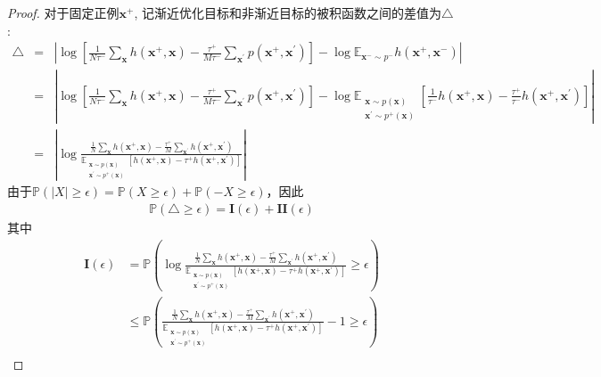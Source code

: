 \begin{lemma}
\begin{proof}
对于固定正例$\mathbf{x}^+$, 记渐近优化目标和非渐近目标的被积函数之间的差值为$\triangle$:
		\begin{eqnarray}
			\triangle &=& | \log [ \frac{1}{N\tau^-}  \sum_{\mathbf{x}} h(\mathbf{x}^+,\mathbf{x})  -\frac{\tau^+}{M\tau^-} \sum_{\mathbf{x}^\prime} p(\mathbf{x}^+,\mathbf{x}^\prime)]  - \log\mathbb{E}_{\mathbf{x}^-\sim p^-}h(\mathbf{x}^+,\mathbf{x}^-)|\nonumber \\
			&=&| \log [ \frac{1}{N\tau^-}  \sum_{\mathbf{x}} h(\mathbf{x}^+,\mathbf{x})  -\frac{\tau^+}{M\tau^-} \sum_{\mathbf{x}^\prime} p(\mathbf{x}^+,\mathbf{x}^\prime)]  - \log\mathbb{E}_{\substack{\mathbf x \sim p(\mathbf x) \\ \mathbf x^\prime \sim p^+(\mathbf x)}} [ \frac{1}{\tau^-}h(\mathbf{x}^+,\mathbf{x}) - \frac{\tau^+}{\tau^-}h(\mathbf{x}^+,\mathbf{x}^\prime)]| \nonumber\\
			&=& | \log \frac{\frac{1}{N}  \sum_{\mathbf{x}} h(\mathbf{x}^+,\mathbf{x})  -\frac{\tau^+}{M} \sum_{\mathbf{x}^\prime} h(\mathbf{x}^+,\mathbf{x}^\prime)}{\mathbb{E}_{\substack{\mathbf x \sim p(\mathbf x) \\ \mathbf x^\prime \sim p^+(\mathbf x)}} [ h(\mathbf{x}^+,\mathbf{x}) - \tau^+h(\mathbf{x}^+,\mathbf{x}^\prime)]} | \nonumber
		\end{eqnarray}
由于$\mathbb{P}(|X|\geq \epsilon )=\mathbb{P}(X\geq \epsilon )+\mathbb{P}(-X\geq \epsilon )$，因此
		\begin{eqnarray}
			\mathbb{P}(\triangle \geq \epsilon) = \mathbf{I}(\epsilon) + \mathbf{II}(\epsilon) 
		\end{eqnarray}
其中
		\begin{align}
			\mathbf{I}(\epsilon) 
			&= \mathbb{P} \left(\log \frac{\frac{1}{N}  \sum_{\mathbf{x}} h(\mathbf{x}^+,\mathbf{x})  -\frac{\tau^+}{M} \sum_{\mathbf{x}^\prime} h(\mathbf{x}^+,\mathbf{x}^\prime)}{\mathbb{E}_{\substack{\mathbf x \sim p(\mathbf x) \\ \mathbf x^\prime \sim p^+(\mathbf x)}} [ h(\mathbf{x}^+,\mathbf{x}) - \tau^+h(\mathbf{x}^+,\mathbf{x}^\prime)]} \geq \epsilon  \right) \\
			&\leq \mathbb{P} \left( \frac{\frac{1}{N}  \sum_{\mathbf{x}} h(\mathbf{x}^+,\mathbf{x})  -\frac{\tau^+}{M} \sum_{\mathbf{x}^\prime} h(\mathbf{x}^+,\mathbf{x}^\prime)}{\mathbb{E}_{\substack{\mathbf x \sim p(\mathbf x) \\ \mathbf x^\prime \sim p^+(\mathbf x)}} [ h(\mathbf{x}^+,\mathbf{x}) - \tau^+h(\mathbf{x}^+,\mathbf{x}^\prime)]}-1 \geq \epsilon  \right) \label{eq:logx}\\

\end{align}
\end{proof}
\end{lemma}
